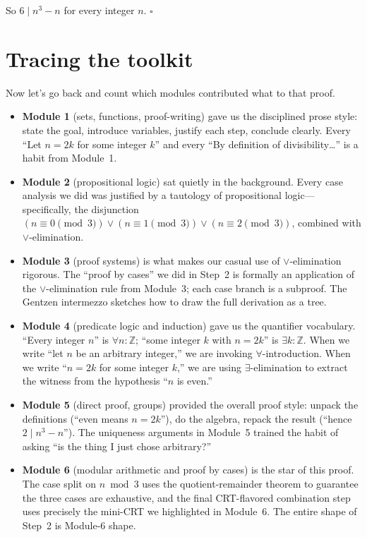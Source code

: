 \documentclass[11pt]{article}
\begin{document}
So $6 \mid n^3 - n$ for every integer $n$. \hfill$\square$

\section*{Tracing the toolkit}

Now let's go back and count which modules contributed what to that proof.

\begin{itemize}
  \item \textbf{Module 1} (sets, functions, proof-writing) gave us the disciplined prose style: state the goal, introduce variables, justify each step, conclude clearly. Every ``Let $n = 2k$ for some integer $k$'' and every ``By definition of divisibility\ldots'' is a habit from Module~1.
  \item \textbf{Module 2} (propositional logic) sat quietly in the background. Every case analysis we did was justified by a tautology of propositional logic---specifically, the disjunction $(n \equiv 0 \pmod 3) \vee (n \equiv 1 \pmod 3) \vee (n \equiv 2 \pmod 3)$, combined with $\vee$-elimination.
  \item \textbf{Module 3} (proof systems) is what makes our casual use of $\vee$-elimination rigorous. The ``proof by cases'' we did in Step~2 is formally an application of the $\vee$-elimination rule from Module~3; each case branch is a subproof. The Gentzen intermezzo sketches how to draw the full derivation as a tree.
  \item \textbf{Module 4} (predicate logic and induction) gave us the quantifier vocabulary. ``Every integer $n$'' is $\forall n : \mathbb{Z}$; ``some integer $k$ with $n = 2k$'' is $\exists k : \mathbb{Z}$. When we write ``let $n$ be an arbitrary integer,'' we are invoking $\forall$-introduction. When we write ``$n = 2k$ for some integer $k$,'' we are using $\exists$-elimination to extract the witness from the hypothesis ``$n$ is even.''
  \item \textbf{Module 5} (direct proof, groups) provided the overall proof style: unpack the definitions (``even means $n = 2k$''), do the algebra, repack the result (``hence $2 \mid n^3 - n$''). The uniqueness arguments in Module~5 trained the habit of asking ``is the thing I just chose arbitrary?''
  \item \textbf{Module 6} (modular arithmetic and proof by cases) is the star of this proof. The case split on $n \bmod 3$ uses the quotient-remainder theorem to guarantee the three cases are exhaustive, and the final CRT-flavored combination step uses precisely the mini-CRT we highlighted in Module~6. The entire shape of Step~2 is Module-6 shape.
\end{itemize}
\end{document}
